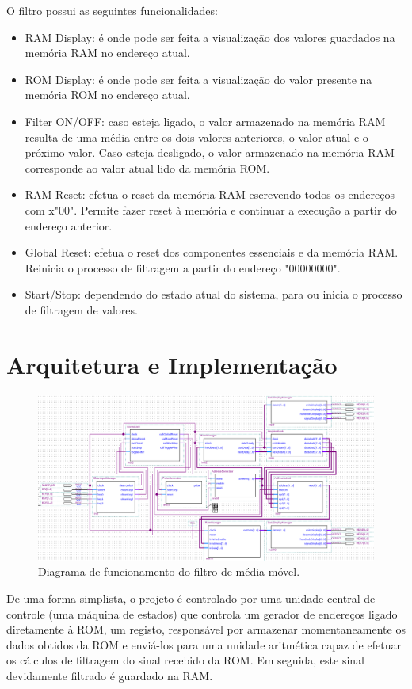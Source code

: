 \documentclass{report}
\begin{document}
O filtro possui as seguintes funcionalidades:
\begin{itemize}
    \item RAM Display: é onde pode ser feita a visualização dos valores guardados na memória RAM no endereço atual.
    \item ROM Display: é onde pode ser feita a visualização do valor presente na memória ROM no endereço atual.
    \item Filter ON/OFF: caso esteja ligado, o valor armazenado na memória RAM resulta de uma média entre os dois valores anteriores, o valor atual e o próximo valor. Caso esteja desligado, o valor armazenado na memória RAM corresponde ao valor atual lido da memória ROM.
    \item RAM Reset: efetua o reset da memória RAM escrevendo todos os endereços com x"00". Permite fazer reset à memória e continuar a execução a partir do endereço anterior.
    \item Global Reset: efetua o reset dos componentes essenciais e da memória RAM. Reinicia o processo de filtragem a partir do endereço "00000000".
    \item Start/Stop: dependendo do estado atual do sistema, para ou inicia o processo de filtragem de valores.
\end{itemize}

\section*{Arquitetura e Implementação}
\label{chap.aquiteturaimplementacao}

\begin{figure}[H]
    \centering
    \includegraphics[width=\textwidth]{schematic.png}
    \caption{Diagrama de funcionamento do filtro de média móvel.}
\end{figure}

De uma forma simplista, o projeto é controlado por uma unidade central de controle (uma máquina de estados) que controla um gerador de endereços ligado diretamente à ROM, um registo, responsável por armazenar momentaneamente os dados obtidos da ROM e enviá-los para uma unidade aritmética  capaz de efetuar os cálculos de filtragem do sinal recebido da ROM. Em seguida, este sinal devidamente filtrado é guardado na RAM.
\end{document}
